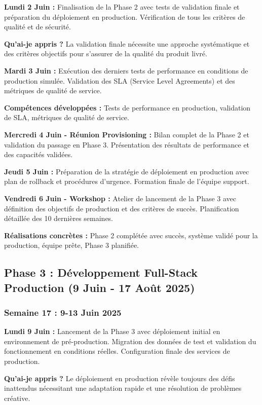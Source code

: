 \documentclass[a4paper,12pt]{article}
\begin{document}
\textbf{Lundi 2 Juin :}
Finalisation de la Phase 2 avec tests de validation finale et préparation du déploiement en production. Vérification de tous les critères de qualité et de sécurité.

\textbf{Qu'ai-je appris ?} La validation finale nécessite une approche systématique et des critères objectifs pour s'assurer de la qualité du produit livré.

\textbf{Mardi 3 Juin :}
Exécution des derniers tests de performance en conditions de production simulée. Validation des SLA (Service Level Agreements) et des métriques de qualité de service.

\textbf{Compétences développées :} Tests de performance en production, validation de SLA, métriques de qualité de service.

\textbf{Mercredi 4 Juin - Réunion Provisioning :}
Bilan complet de la Phase 2 et validation du passage en Phase 3. Présentation des résultats de performance et des capacités validées.

\textbf{Jeudi 5 Juin :}
Préparation de la stratégie de déploiement en production avec plan de rollback et procédures d'urgence. Formation finale de l'équipe support.

\textbf{Vendredi 6 Juin - Workshop :}
Atelier de lancement de la Phase 3 avec définition des objectifs de production et des critères de succès. Planification détaillée des 10 dernières semaines.

\textbf{Réalisations concrètes :} Phase 2 complétée avec succès, système validé pour la production, équipe prête, Phase 3 planifiée.

\subsection{Phase 3 : Développement Full-Stack Production (9 Juin - 17 Août 2025)}

\subsubsection{Semaine 17 : 9-13 Juin 2025}

\textbf{Lundi 9 Juin :}
Lancement de la Phase 3 avec déploiement initial en environnement de pré-production. Migration des données de test et validation du fonctionnement en conditions réelles. Configuration finale des services de production.

\textbf{Qu'ai-je appris ?} Le déploiement en production révèle toujours des défis inattendus nécessitant une adaptation rapide et une résolution de problèmes créative.
\end{document}
